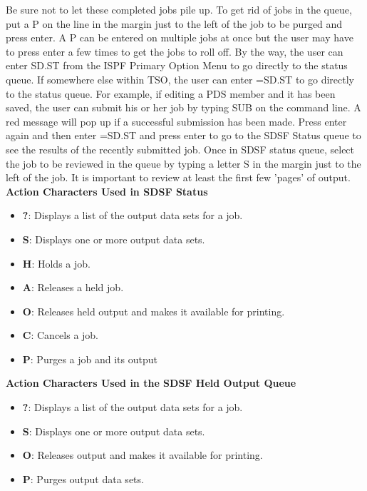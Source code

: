 \documentclass{report}
\begin{document}
\begin{itemize}
            \bigbreak \noindent 
            Be sure not to let these completed jobs pile up. To get rid of jobs in the queue, put a P on the line in the margin just to the left of the job to be purged and press enter. A P can be entered on multiple jobs at once but the user may have to press enter a few times to get the jobs to roll off.
            \bigbreak \noindent 
            By the way, the user can enter SD.ST from the ISPF Primary Option Menu to go directly to the status queue. If somewhere else within TSO, the user can enter =SD.ST to go directly to the status queue. For example, if editing a PDS member and it has been saved, the user can submit his or her job by typing SUB on the command line. A red message will pop up if a successful submission has been made. Press enter again and then enter =SD.ST and press enter to go to the SDSF Status queue to see the results of the recently submitted job.
            \bigbreak \noindent 
            Once in SDSF status queue, select the job to be reviewed in the queue by typing a letter S in the margin just to the left of the job. It is important to review at least the first few 'pages' of output.
            \bigbreak \noindent 
            \textbf{Action Characters Used in SDSF Status}
            \begin{itemize}
                \item \textbf{?}: Displays a list of the output data sets for a job.
                \item \textbf{S}: Displays one or more output data sets.
                \item \textbf{H}: Holds a job.
                \item \textbf{A}: Releases a held job.
                \item \textbf{O}: Releases held output and makes it available for printing.
                \item \textbf{C}: Cancels a job.
                \item \textbf{P}: Purges a job and its output
            \end{itemize}
            \bigbreak \noindent 
            \textbf{Action Characters Used in the SDSF Held Output Queue}
            \begin{itemize}
                \item \textbf{?}: Displays a list of the output data sets for a job.
                \item \textbf{S}: Displays one or more output data sets.
                \item \textbf{O}: Releases output and makes it available for printing.
                \item \textbf{P}: Purges output data sets.
            \end{itemize}
    \end{itemize}
\end{document}

